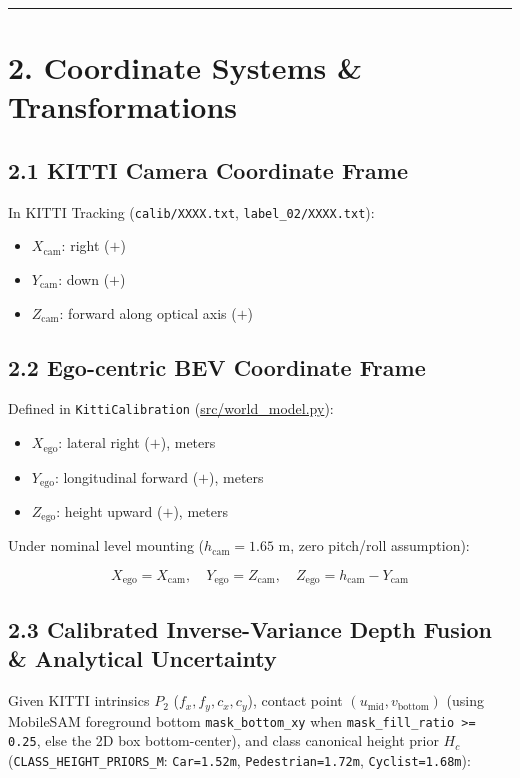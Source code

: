 \documentclass[10.5pt,a4paper]{article}
\begin{document}
\par\noindent\rule{\textwidth}{0.4pt}\par\medskip

\section{2. Coordinate Systems \& Transformations}

\subsection{2.1 KITTI Camera Coordinate Frame}
In KITTI Tracking (\texttt{calib/\allowbreak{}XXXX.\allowbreak{}txt}, \texttt{label\_\allowbreak{}02/\allowbreak{}XXXX.\allowbreak{}txt}):

\begin{itemize}[leftmargin=1.5em,itemsep=2pt]
\item $X_{\text{cam}}$: right ($+$)
\item $Y_{\text{cam}}$: down ($+$)
\item $Z_{\text{cam}}$: forward along optical axis ($+$)
\end{itemize}

\subsection{2.2 Ego-centric BEV Coordinate Frame}
Defined in \texttt{KittiCalibration} (\href{https://github.com/Heisnotanimposter/Totalcare\_autonomous\_driving\_Yolov5/blob/main/src/world\_model.py}{src/world\_model.py}):

\begin{itemize}[leftmargin=1.5em,itemsep=2pt]
\item $X_{\text{ego}}$: lateral right ($+$), meters
\item $Y_{\text{ego}}$: longitudinal forward ($+$), meters
\item $Z_{\text{ego}}$: height upward ($+$), meters
\end{itemize}

Under nominal level mounting ($h_{\text{cam}} = 1.65\text{ m}$, zero pitch/roll assumption):

\[X_{\text{ego}} = X_{\text{cam}}, \quad Y_{\text{ego}} = Z_{\text{cam}}, \quad Z_{\text{ego}} = h_{\text{cam}} - Y_{\text{cam}}\]

\subsection{2.3 Calibrated Inverse-Variance Depth Fusion \& Analytical Uncertainty}
Given KITTI intrinsics $P_2$ ($f_x, f_y, c_x, c_y$), contact point $(u_{\text{mid}}, v_{\text{bottom}})$ (using MobileSAM foreground bottom \texttt{mask\_\allowbreak{}bottom\_\allowbreak{}xy} when \texttt{mask\_\allowbreak{}fill\_\allowbreak{}ratio >= 0.\allowbreak{}25}, else the 2D box bottom-center), and class canonical height prior $H_c$ (\texttt{CLASS\_\allowbreak{}HEIGHT\_\allowbreak{}PRIORS\_\allowbreak{}M}: \texttt{Car=1.\allowbreak{}52m}, \texttt{Pedestrian=1.\allowbreak{}72m}, \texttt{Cyclist=1.\allowbreak{}68m}):
\end{document}
